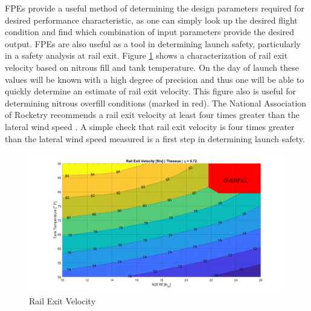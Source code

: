 \documentclass[10pt,a4paper]{article}
\begin{document}
FPEs provide a useful method of determining the design parameters required for desired performance characteristic, as one can simply look up the desired flight condition and find which combination of input parameters provide the desired output. FPEs are also useful as a tool in determining launch safety, particularly in a safety analysis at rail exit. Figure \ref{fig:rail_exit} shows a characterization of rail exit velocity based on nitrous fill and tank temperature. On the day of launch these values will be known with a high degree of precision and thus one will be able to quickly determine an estimate of rail exit velocity. This figure also is useful for determining nitrous overfill conditions (marked in red). The National Association of Rocketry recommends a rail exit velocity at least four times greater than the lateral wind speed \cite{nar}. A simple check that rail exit velocity is four times greater than the lateral wind speed measured is a first step in determining launch safety.
\begin{figure}[h!]
	\centering
	\includegraphics[width=1\textwidth]{./figs/rail_exit.png}
	\caption{Rail Exit Velocity}
	\label{fig:rail_exit}
\end{figure}
\end{document}
